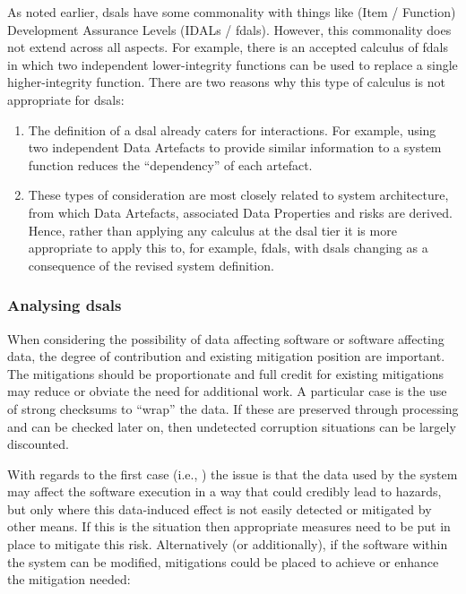 As noted earlier, \glspl{dsal} have some commonality with things like (Item / Function) Development Assurance Levels (IDALs / \glspl{fdal}). However, this commonality does not extend across all aspects. For example, there is an accepted calculus of \glspl{fdal} in which two independent lower-integrity functions can be used to replace a single higher-integrity function. There are two reasons why this type of calculus is not appropriate for \glspl{dsal}:

\begin{enumerate}
  \item The definition of a \gls{dsal} already caters for interactions. For example, using two independent Data Artefacts to provide similar information to a system function reduces the ``dependency'' of each artefact.
  \item These types of consideration are most closely related to system architecture, from which Data Artefacts, associated Data Properties and risks are derived. Hence, rather than applying any calculus at the \gls{dsal} tier it is more appropriate to apply this to, for example, \glspl{fdal}, with \glspl{dsal} changing as a consequence of the revised system definition.
\end{enumerate}

\subsubsection{Analysing \glspl{dsal}}
When considering the possibility of data affecting software or software affecting data, the degree of contribution and existing mitigation position are important. The mitigations should be proportionate and full credit for existing mitigations may reduce or obviate the need for additional work. A particular case is the use of strong checksums to ``wrap'' the data. If these are preserved through processing and can be checked later on, then undetected  corruption situations can be largely discounted.

With regards to the first case (i.e., ) the issue is that the data used by the system may affect the software execution in a way that could credibly lead to hazards, but only where this data-induced effect is not easily detected or mitigated by other means. If this is the situation then appropriate measures need to be put in place  to mitigate this risk. Alternatively (or additionally), if the software within the system can be modified, mitigations could be placed  to achieve or enhance the mitigation needed:

